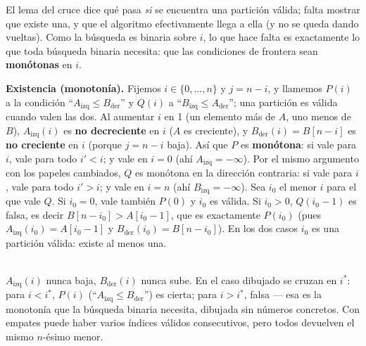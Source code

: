 \documentclass[11pt]{article}
\begin{document}
El lema del cruce dice qué pasa \emph{si} se encuentra una partición válida; falta mostrar que existe una, y
que el algoritmo efectivamente llega a ella (y no se queda dando vueltas). Como la búsqueda es binaria sobre
$i$, lo que hace falta es exactamente lo que toda búsqueda binaria necesita: que las condiciones de frontera
sean \textbf{monótonas} en $i$.

\textbf{Existencia (monotonía).} Fijemos $i\in\{0,\dots,n\}$ y $j=n-i$, y llamemos $P(i)$ a la condición
``$A_{\mathrm{izq}}\le B_{\mathrm{der}}$'' y $Q(i)$ a ``$B_{\mathrm{izq}}\le A_{\mathrm{der}}$''; una partición
es válida cuando valen las dos. Al aumentar $i$ en 1 (un elemento más de $A$, uno menos de $B$),
$A_{\mathrm{izq}}(i)$ es \textbf{no decreciente} en $i$ ($A$ es creciente), y $B_{\mathrm{der}}(i)=B[n-i]$ es
\textbf{no creciente} en $i$ (porque $j=n-i$ baja). Así que $P$ es \textbf{monótona}: si vale para $i$, vale
para todo $i'<i$; y vale en $i=0$ (ahí $A_{\mathrm{izq}}=-\infty$). Por el mismo argumento con los papeles
cambiados, $Q$ es monótona en la dirección contraria: si vale para $i$, vale para todo $i'>i$; y vale en
$i=n$ (ahí $B_{\mathrm{izq}}=-\infty$). Sea $i_0$ el menor $i$ para el que vale $Q$. Si $i_0=0$, vale también
$P(0)$ y $i_0$ es válida. Si $i_0>0$, $Q(i_0-1)$ es falsa, es decir $B[n-i_0]>A[i_0-1]$, que es exactamente
$P(i_0)$ (pues $A_{\mathrm{izq}}(i_0)=A[i_0-1]$ y $B_{\mathrm{der}}(i_0)=B[n-i_0]$). En los dos casos $i_0$ es
una partición válida: existe al menos una.

\begin{center}
\\[4pt]
{\footnotesize $A_{\mathrm{izq}}(i)$ nunca baja, $B_{\mathrm{der}}(i)$ nunca sube. En el caso dibujado se
cruzan en $i^\ast$: para $i<i^\ast$, $P(i)$ (``$A_{\mathrm{izq}}\le B_{\mathrm{der}}$'') es cierta; para
$i>i^\ast$, falsa --- esa es la monotonía que la búsqueda binaria necesita, dibujada sin números concretos.
Con empates puede haber varios índices válidos consecutivos, pero todos devuelven el mismo $n$-ésimo menor.}
\end{center}
\end{document}
